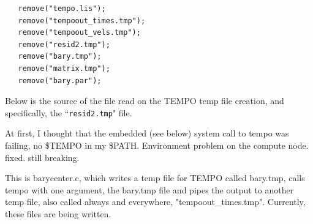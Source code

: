\documentclass[a4paper,10pt,bibtotoc]{scrartcl}
\begin{document}
\begin{verbatim}  
   remove("tempo.lis");
   remove("tempoout_times.tmp");
   remove("tempoout_vels.tmp");
   remove("resid2.tmp");
   remove("bary.tmp");
   remove("matrix.tmp");
   remove("bary.par");
\end{verbatim}

Below is the source of the file read on the TEMPO temp file creation,
and specifically, the ``\verb|resid2.tmp|" file.

At first, I thought that the embedded (see below) system call to tempo 
was failing, no \$TEMPO in my \$PATH.  Environment problem on the
compute node. fixed. still breaking.

This is barycenter.c, which writes a temp file for TEMPO called bary.tmp,
calls tempo with one argument, the bary.tmp file and pipes the output to
another temp file, also called always and everywhere, "tempoout\_times.tmp".
Currently, these files are being written.
\end{document}

